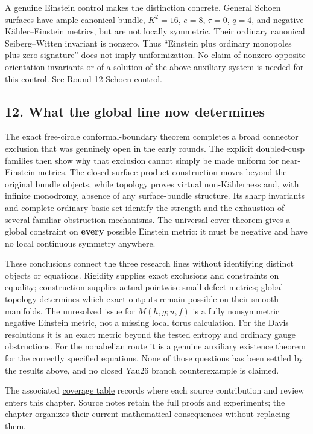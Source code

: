 \documentclass[
  english,
]{article}
\begin{document}
A genuine Einstein control makes the distinction concrete. General
Schoen surfaces have ample canonical bundle, \(K^2=16\), \(e=8\),
\(\tau=0\), \(q=4\), and negative Kähler--Einstein metrics, but are not
locally symmetric. Their ordinary canonical Seiberg--Witten invariant is
nonzero. Thus ``Einstein plus ordinary monopoles plus zero signature''
does not imply uniformization. No claim of nonzero opposite-orientation
invariants or of a solution of the above auxiliary system is needed for
this control. See \href{../proofs/round12_control.md}{Round 12 Schoen
control}.

\hypertarget{what-the-global-line-now-determines}{%
\subsection{12. What the global line now
determines}\label{what-the-global-line-now-determines}}

The exact free-circle conformal-boundary theorem completes a broad
connector exclusion that was genuinely open in the early rounds. The
explicit doubled-cusp families then show why that exclusion cannot
simply be made uniform for near-Einstein metrics. The closed
surface-product construction moves beyond the original bundle objects,
while topology proves virtual non-Kählerness and, with infinite
monodromy, absence of any surface-bundle structure. Its sharp invariants
and complete ordinary basic set identify the strength and the exhaustion
of several familiar obstruction mechanisms. The universal-cover theorem
gives a global constraint on \textbf{every} possible Einstein metric: it
must be negative and have no local continuous symmetry anywhere.

These conclusions connect the three research lines without identifying
distinct objects or equations. Rigidity supplies exact exclusions and
constraints on equality; construction supplies actual
pointwise-small-defect metrics; global topology determines which exact
outputs remain possible on their smooth manifolds. The unresolved issue
for \(M(h,g;u,f)\) is a fully nonsymmetric negative Einstein metric, not
a missing local torus calculation. For the Davis resolutions it is an
exact metric beyond the tested entropy and ordinary gauge obstructions.
For the nonabelian route it is a genuine auxiliary existence theorem for
the correctly specified equations. None of those questions has been
settled by the results above, and no closed Yau26 branch counterexample
is claimed.

The associated \href{../coverage/03_global_coverage.tsv}{coverage table}
records where each source contribution and review enters this chapter.
Source notes retain the full proofs and experiments; the chapter
organizes their current mathematical consequences without replacing
them.
\end{document}
